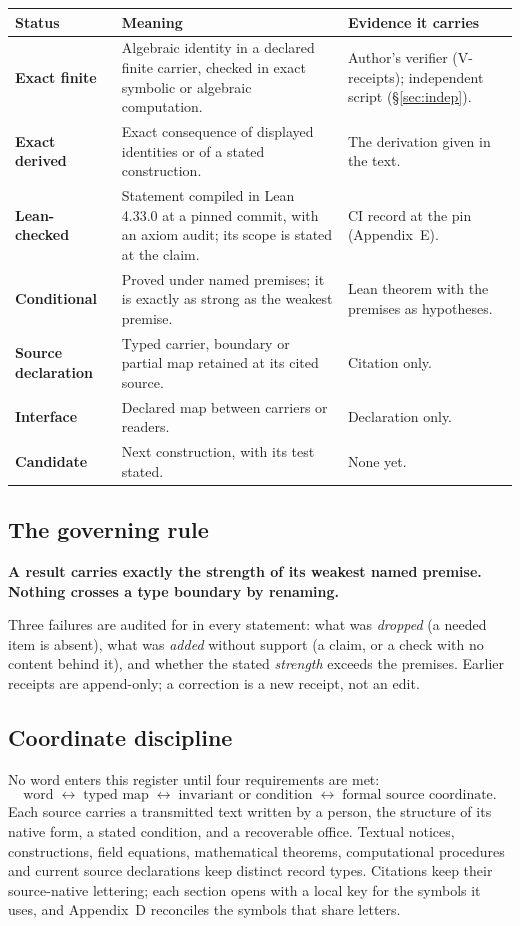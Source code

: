 \documentclass[11pt,a4paper]{article}
\newcommand{\st}[1]{\textsf{\small\textbf{#1}}}
\newcommand{\Sfin}{\st{Exact finite}}\newcommand{\Sder}{\st{Exact derived}}
\newcommand{\Slean}{\st{Lean-checked}}\newcommand{\Scond}{\st{Conditional}}
\newcommand{\Ssrc}{\st{Source declaration}}\newcommand{\Sint}{\st{Interface}}
\newcommand{\Scand}{\st{Candidate}}
\theoremstyle{plain}
\theoremstyle{definition}
\theoremstyle{remark}
\begin{document}
\begin{center}\small
\begin{tabularx}{\linewidth}{@{}>{\raggedright\arraybackslash}p{2.6cm}>{\raggedright\arraybackslash}X>{\raggedright\arraybackslash}p{4.4cm}@{}}
\toprule
Status & Meaning & Evidence it carries\\\midrule
\Sfin & Algebraic identity in a declared finite carrier, checked in exact symbolic or algebraic computation. & Author's verifier (V-receipts); independent script (\S\ref{sec:indep}).\\
\Sder & Exact consequence of displayed identities or of a stated construction. & The derivation given in the text.\\
\Slean & Statement compiled in Lean 4.33.0 at a pinned commit, with an axiom audit; its scope is stated at the claim. & CI record at the pin (Appendix~E).\\
\Scond & Proved under named premises; it is exactly as strong as the weakest premise. & Lean theorem with the premises as hypotheses.\\
\Ssrc & Typed carrier, boundary or partial map retained at its cited source. & Citation only.\\
\Sint & Declared map between carriers or readers. & Declaration only.\\
\Scand & Next construction, with its test stated. & None yet.\\\bottomrule
\end{tabularx}
\end{center}

\subsection{The governing rule}
\begin{rulebox}
\textbf{A result carries exactly the strength of its weakest named premise. Nothing crosses a type boundary by renaming.}
\end{rulebox}
Three failures are audited for in every statement: what was \emph{dropped} (a needed item is absent), what was \emph{added} without support (a claim, or a check with no content behind it), and whether the stated \emph{strength} exceeds the premises. Earlier receipts are append-only; a correction is a new receipt, not an edit.

\subsection{Coordinate discipline}
No word enters this register until four requirements are met:
\[
\text{word}\;\longleftrightarrow\;\text{typed map}\;\longleftrightarrow\;\text{invariant or condition}\;\longleftrightarrow\;\text{formal source coordinate.}
\]
Each source carries a transmitted text written by a person, the structure of its native form, a stated condition, and a recoverable office. Textual notices, constructions, field equations, mathematical theorems, computational procedures and current source declarations keep distinct record types. Citations keep their source-native lettering; each section opens with a local key for the symbols it uses, and Appendix~D reconciles the symbols that share letters.
\end{document}
